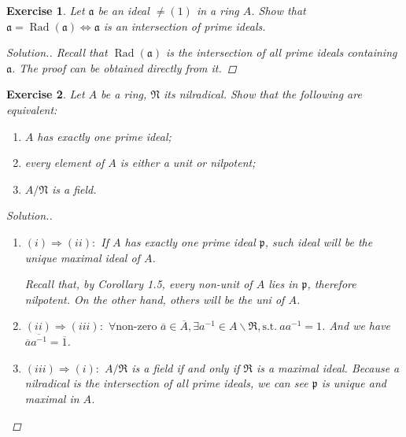 \documentclass{article}
\theoremstyle{breakstyle}
\newtheorem{exercise}{Exercise}
\newenvironment{solution}
  {\begin{proof}[Solution.]\renewcommand{\qedsymbol}{}}
  {\end{proof}}
\DeclareMathOperator{\rad}{Rad}
\begin{document}
\begin{exercise}
Let \(\mathfrak a\) be an ideal \(\neq(1)\) in a ring \(A\). Show that \(\mathfrak a=\rad(\mathfrak a)\Leftrightarrow\mathfrak a\) is an intersection of prime ideals.

\begin{solution}
    Recall that $\rad(\mathfrak{a})$ is the intersection of all prime ideals containing $\mathfrak{a}$.
        The proof can be obtained directly from it.
\end{solution}
\end{exercise}

\begin{exercise}
Let \(A\) be a ring, \(\mathfrak N\) its nilradical. Show that the following are equivalent:
\begin{enumerate}[label=(\roman*)]
    \item \(A\) has exactly one prime ideal;
    \item every element of \(A\) is either a unit or nilpotent;
    \item \(A/\mathfrak N\) is a field.
\end{enumerate}

\begin{solution}
    \begin{enumerate}[label=({\alph*})]
            \item  $(i)\Rightarrow(ii):$
                If $A$ has exactly one prime ideal $\mathfrak{p}$, such ideal will be the unique maximal ideal of $A$.

                Recall that, by \emph{Corollary 1.5}, every non-unit of $A$ lies in $\mathfrak{p}$, therefore nilpotent.
                On the other hand, others will be the uni of $A$.
            \item $(ii)\Rightarrow(iii):$ 
                $\forall \text{non-zero }\overline{a}\in \overline{A},\exists a^{-1}\in A\backslash \mathfrak{R},\mathrm{s.t.}\ aa^{-1}=1$.
                And we have $\overline{a}\overline{a^{-1}}=\overline{1}$.
            \item $(iii)\Rightarrow(i):$
                $A / \mathfrak{R}$ is a field if and only if $\mathfrak{R}$ is a maximal ideal.
                Because a nilradical is the intersection of all prime ideals, we can see $\mathfrak{p}$ is unique and maximal in $A$.
        \end{enumerate}
\end{solution}
\end{exercise}
\end{document}
